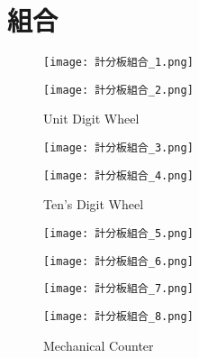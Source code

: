 \section{組合}
{
\begin{figure}[hbt!]
  \centering
  \texttt{[image: 計分板組合\_1.png]}
\end{figure}
\begin{figure}[hbt!]
  \centering
  \texttt{[image: 計分板組合\_2.png]}
  \caption{Unit Digit Wheel}
  \label{fig:photo10}
\end{figure}

\begin{figure}[hbt!]
  \centering
  \texttt{[image: 計分板組合\_3.png]}
\end{figure}
\begin{figure}[hbt!]
  \centering
  \texttt{[image: 計分板組合\_4.png]}
  \caption{Ten's Digit Wheel}
  \label{fig:photo11}
\end{figure}

\begin{figure}[hbt!]
  \centering
  \texttt{[image: 計分板組合\_5.png]}
\end{figure}
\begin{figure}[hbt!]
  \centering
  \texttt{[image: 計分板組合\_6.png]}
\end{figure}
\begin{figure}[hbt!]
  \centering
  \texttt{[image: 計分板組合\_7.png]}
\end{figure}
\begin{figure}[hbt!]
  \centering
  \texttt{[image: 計分板組合\_8.png]}
  \caption{Mechanical Counter}
  \label{fig:photo12}
\end{figure}
}

